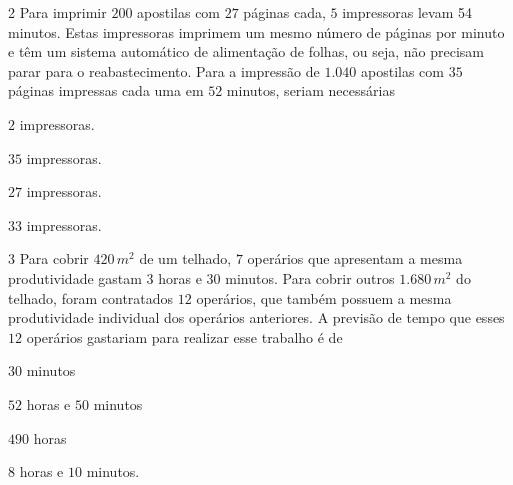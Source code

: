\num{2}  Para imprimir $200$ apostilas com $27$ páginas cada, $5$ impressoras levam
54 minutos. Estas impressoras imprimem um mesmo número de páginas por
minuto e têm um sistema automático de alimentação de folhas, ou seja,
não precisam parar para o reabastecimento. Para a impressão de $1.040$
apostilas com $35$ páginas impressas cada uma em $52$ minutos, seriam
necessárias

\begin{escolha}
\item $2$ impressoras.
\item $35$ impressoras.
\item $27$ impressoras.
\item $33$ impressoras.
\end{escolha}



\num{3}  Para cobrir $420\,m^2$ de um telhado, $7$ operários que apresentam a mesma
produtividade gastam $3$ horas e $30$ minutos. Para cobrir outros $1.680\,m^2$
do telhado, foram contratados $12$ operários, que também possuem a mesma
produtividade individual dos operários anteriores. A previsão de tempo
que esses $12$ operários gastariam para realizar esse trabalho é de

\begin{escolha}
\item $30$ minutos
\item $52$ horas e $50$ minutos
\item $490$ horas
\item $8$ horas e $10$ minutos.
\end{escolha}



